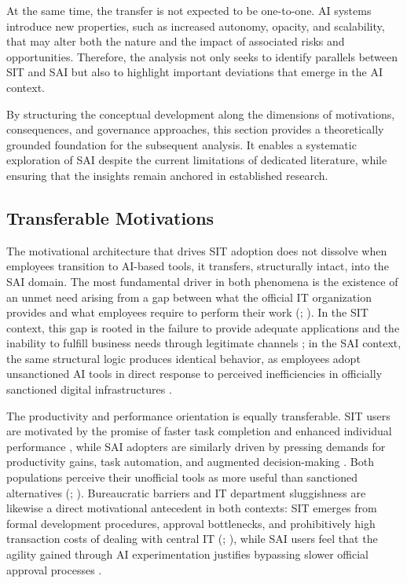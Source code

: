 \documentclass[12pt,oneside]{article}
\begin{document}
At the same time, the transfer is not expected to be one-to-one. \ac{AI} systems introduce new properties, such as increased autonomy, opacity, and scalability, that may alter both the nature and the impact of associated risks and opportunities. Therefore, the analysis not only seeks to identify parallels between \ac{SIT} and \ac{SAI} but also to highlight important deviations that emerge in the \ac{AI} context.

By structuring the conceptual development along the dimensions of motivations, consequences, and governance approaches, this section provides a theoretically grounded foundation for the subsequent analysis. It enables a systematic exploration of \ac{SAI} despite the current limitations of dedicated literature, while ensuring that the insights remain anchored in established research.

\subsection{Transferable Motivations} \label{transferable-motivations}

The motivational architecture that drives \ac{SIT} adoption does not dissolve when employees transition to \ac{AI}-based tools, it transfers, structurally intact, into the \ac{SAI} domain. The most fundamental driver in both phenomena is the existence of an unmet need arising from a gap between what the official \ac{IT} organization provides and what employees require to perform their work (\citealp[148]{rakovic2020shadow}; \citealp[6]{ross2025shadowai}). In the \ac{SIT} context, this gap is rooted in the failure to provide adequate applications and the inability to fulfill business needs through legitimate channels \citep[6]{gyoery2012exploring}; in the \ac{SAI} context, the same structural logic produces identical behavior, as employees adopt unsanctioned \ac{AI} tools in direct response to perceived inefficiencies in officially sanctioned digital infrastructures \citep[2]{ross2025shadowai}.

The productivity and performance orientation is equally transferable. \ac{SIT} users are motivated by the promise of faster task completion and enhanced individual performance \citep[239]{pinto2023encourage}, while \ac{SAI} adopters are similarly driven by pressing demands for productivity gains, task automation, and augmented decision-making \citep[2, 3]{ross2025shadowai}. Both populations perceive their unofficial tools as more useful than sanctioned alternatives (\citealp[3]{mallmann2016behavioral}; \citealp[2]{chin2025conflicting}). Bureaucratic barriers and \ac{IT} department sluggishness are likewise a direct motivational antecedent in both contexts: \ac{SIT} emerges from formal development procedures, approval bottlenecks, and prohibitively high transaction costs of dealing with central \ac{IT} (\citealp[7]{zimmermann2014managing}; \citealp[9]{chua2014central}), while \ac{SAI} users feel that the agility gained through \ac{AI} experimentation justifies bypassing slower official approval processes \citep[1136]{raizada2026shadowai}.
\end{document}
